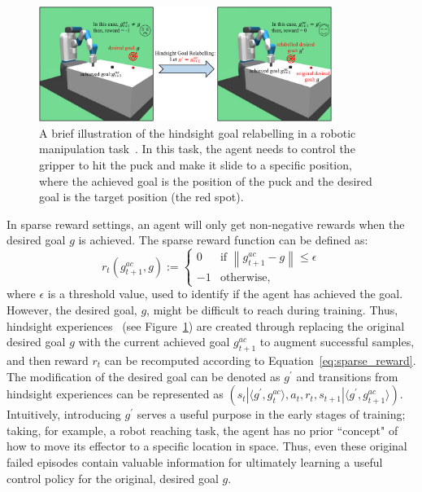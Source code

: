 \begin{figure}[h]
    \centering
    \includegraphics[width=0.85\textwidth]{figures/background/her_background.pdf}
    \caption{A brief illustration of the hindsight goal relabelling in a robotic manipulation task~\cite{plappert2018multi}. In this task, the agent needs to control the gripper to hit the puck and make it slide to a specific position, where the achieved goal is the position of the puck and the desired goal is the target position (the red spot).}
    \label{fig:her_back}
\end{figure}
In sparse reward settings, an agent will only get non-negative rewards when the desired goal $g$ is achieved. The sparse reward function can be defined as:
\begin{equation}
r_{t}\left(g^{ac}_{t+1}, g\right):=
\begin{cases}
0& \text{if $\left\|g^{ac}_{t+1} - g\right\|\leq\epsilon$}\\
-1& \text{otherwise},
\end{cases}
\label{eq:sparse_reward}
\end{equation}
where $\epsilon$ is a threshold value, used to identify if the agent has achieved the goal. {However, the desired goal, $g$, might be difficult to reach during training. Thus, hindsight experiences~\cite{andrychowicz2017hindsight} (see Figure~\ref{fig:her_back}) are created through replacing the original desired goal $g$ with the current achieved goal $g_{t+1}^{ac}$ to augment successful samples, and then reward $r_{t}$ can be recomputed according to Equation~\eqref{eq:sparse_reward}. The modification of the desired goal can be denoted as $g^\prime$ and transitions from hindsight experiences can be represented as $(s_t|\langle g^\prime, g^{ac}_{t} \rangle, a_t, r_t, s_{t+1}|\langle g^\prime, g^{ac}_{t+1} \rangle)$.} {Intuitively, introducing $g^\prime$ serves a useful purpose in the early stages of training; taking, for example, a robot reaching task, the agent has no prior ``concept" of how to move its effector to a specific location in space. Thus, even these original failed episodes contain valuable information for ultimately learning a useful control policy for the original, desired goal $g$.}


